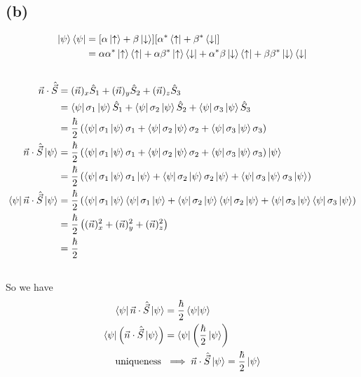 \documentclass[letter, 10pts]{article}
\newcommand{\hb}{\hbar}
\newcommand{\U}{\uparrow}
\newcommand{\D}{\downarrow}
\begin{document}
\subsection*{(b)}
\begin{align*}
	\ket{\psi} \bra{\psi} &= [ \alpha \ket{\U} + \beta \ket{\D} ] [\alpha ^{*} \bra{\U} + \beta^{*} \bra{\D}] 
	\\
	&= 
\alpha \alpha ^{*} \ket{\U} \bra{\U} + 
\alpha \beta ^{*} \ket{\U} \bra{\D} + 
\alpha ^{*} \beta \ket{\D} \bra{\U} + 
\beta \beta^{*} \ket{\D} \bra{\D}
	\\\\
\end{align*}
\begin{align*}
	\vec{n} \cdot \hat{\vec{S}} 
	&= 
	(\vec{n})_x \hat S_1 + 
	(\vec{n})_y  \hat S_2 + 
	(\vec{n})_z  \hat S_3 
	\\
	&= 
\bra{\psi} \sigma_1 \ket{\psi} \hat{S}_1  +
\bra{\psi} \sigma_2 \ket{\psi} \hat{S}_2 + 
\bra{\psi} \sigma_3 \ket{\psi} \hat{S}_3 
	\\
	&= \frac{\hb}{2} \left(
\bra{\psi} \sigma_1 \ket{\psi} \sigma_1  +
\bra{\psi} \sigma_2 \ket{\psi} \sigma_2 + 
\bra{\psi} \sigma_3 \ket{\psi} \sigma_3 
\right)
	\\
	\vec{n} \cdot  \hat{\vec{S}} \ket{\psi} &= 
	\frac{\hb}{2} \left(
\bra{\psi} \sigma_1 \ket{\psi} \sigma_1  +
\bra{\psi} \sigma_2 \ket{\psi} \sigma_2 + 
\bra{\psi} \sigma_3 \ket{\psi} \sigma_3 
\right) \ket{\psi}
	\\
	&=  \frac{\hb}{2} \left(
\bra{\psi} \sigma_1 \ket{\psi} \sigma_1  \ket{\psi}+
\bra{\psi} \sigma_2 \ket{\psi} \sigma_2 \ket{\psi}+ 
\bra{\psi} \sigma_3 \ket{\psi} \sigma_3 \ket{\psi} 
\right) \\ 
	 \bra{\psi} \vec{n} \cdot  \hat{\vec{S}} \ket{\psi} 
	&=  \frac{\hb}{2} \left(
\bra{\psi} \sigma_1 \ket{\psi} \bra{\psi} \sigma_1  \ket{\psi}+
\bra{\psi} \sigma_2 \ket{\psi}\bra{\psi} \sigma_2 \ket{\psi}+ 
\bra{\psi} \sigma_3 \ket{\psi} \bra{\psi}\sigma_3 \ket{\psi} 
\right) \\
&= 
\frac{\hb}{2}
\left(
	(\vec{n})_x ^2 + 
	(\vec{n})_y ^2 + 
	(\vec{n})_z ^2
\right) \\
&= 
\frac{\hb}{2}
\\
\\
\end{align*}
So we have
\begin{align*}
	\bra{\psi} \vec{n} \cdot  \hat{\vec{S}} \ket{\psi} &= \frac{\hb}{2} \braket{\psi | \psi} \\ 
	\bra{
\psi} 
\left(
\vec{n} \cdot \hat{\vec{S}} \ket{\psi}
\right) &= 
\bra{\psi} 
\left(
\frac{\hb}{2} \ket{\psi}
\right)
\\ \text{ uniqueness } 
	&\implies 
	\vec{n} \cdot  \hat{\vec{S}} \ket{\psi} = \frac{\hb}{2} \ket{\psi}
\end{align*}
\end{document}
